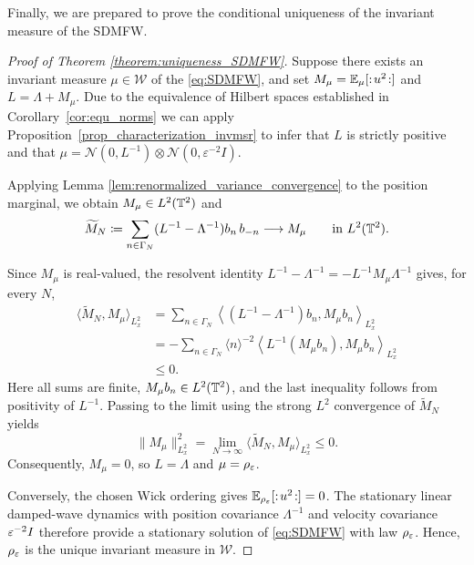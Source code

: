 Finally, we are prepared to prove the conditional uniqueness of the invariant measure of the SDMFW.
\begin{proof}[Proof of Theorem \ref{theorem:uniqueness_SDMFW}]
    Suppose there exists an invariant measure $\mu \in \mathcal{W}$ of the \eqref{eq:SDMFW}, and set $M_\mu=\mathbb E_\mu[:\! u^2 \!:]$ and $L=\Lambda+M_\mu$. 
    Due to the equivalence of Hilbert spaces established in Corollary~\ref{cor:equ_norms} we can apply Proposition~\ref{prop_characterization_invmsr} to infer that $L$ is strictly positive and that $\mu = \mathcal{N}(0, L^{-1}) \otimes \mathcal{N}(0, \varepsilon^{-2}I)$. 
    
    Applying Lemma \ref{lem:renormalized_variance_convergence}
    to the position marginal, we obtain
    $M_\mu\in L^2(\mathbb{T}^2)$ and
    \[
        \widetilde M_N
        \coloneqq
        \sum_{n\in\Gamma_N}
        (L^{-1}-\Lambda^{-1})b_n\,b_{-n}
        \longrightarrow M_\mu
        \qquad\text{in }L^2(\mathbb{T}^2).
    \]

    Since $M_\mu$ is real-valued, the resolvent identity
    $L^{-1}-\Lambda^{-1}=-L^{-1}M_\mu\Lambda^{-1}$
    gives, for every $N$,
    \begin{align*}
        \langle\widetilde M_N,M_\mu\rangle_{L^2_x}
        &=
        \sum_{n\in\Gamma_N}
        \left\langle
            (L^{-1}-\Lambda^{-1})b_n,M_\mu b_n
        \right\rangle_{L^2_x}\\
        &=
        -\sum_{n\in\Gamma_N}\langle n\rangle^{-2}
        \left\langle
            L^{-1}(M_\mu b_n),M_\mu b_n
        \right\rangle_{L^2_x}\\
        &\leq0.
    \end{align*}
    Here all sums are finite, $M_\mu b_n\in L^2(\mathbb{T}^2)$,
    and the last inequality follows from positivity of
    $L^{-1}$.
    Passing to the limit using the strong $L^2$ convergence
    of $\widetilde M_N$ yields
    \[
        \|M_\mu\|_{L^2_x}^2
        =
        \lim_{N\to\infty}
        \langle\widetilde M_N,M_\mu\rangle_{L^2_x}
        \leq0.
    \]
    Consequently, $M_\mu=0$, so $L=\Lambda$ and
    $\mu=\rho_\varepsilon$.

    Conversely, the chosen Wick ordering gives
    $\mathbb E_{\rho_\varepsilon}[:\! u^2 \!:]=0$.
    The stationary linear damped-wave dynamics with
    position covariance $\Lambda^{-1}$ and velocity
    covariance $\varepsilon^{-2}I$ therefore provide a stationary
    solution of \eqref{eq:SDMFW} with law $\rho_\varepsilon$.
    Hence, $\rho_\varepsilon$ is the unique invariant measure
    in $\mathcal W$.
\end{proof}


